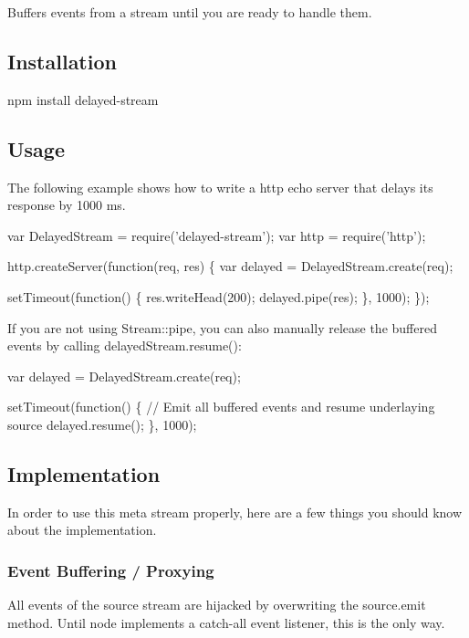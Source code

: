 Buffers events from a stream until you are ready to handle them.

\subsection*{Installation}


\begin{DoxyCode}
npm install delayed-stream
\end{DoxyCode}


\subsection*{Usage}

The following example shows how to write a http echo server that delays its response by 1000 ms.


\begin{DoxyCode}
var DelayedStream = require('delayed-stream');
var http = require('http');

http.createServer(function(req, res) \{
  var delayed = DelayedStream.create(req);

  setTimeout(function() \{
    res.writeHead(200);
    delayed.pipe(res);
  \}, 1000);
\});
\end{DoxyCode}


If you are not using {\ttfamily Stream\+::pipe}, you can also manually release the buffered events by calling {\ttfamily delayed\+Stream.\+resume()}\+:


\begin{DoxyCode}
var delayed = DelayedStream.create(req);

setTimeout(function() \{
  // Emit all buffered events and resume underlaying source
  delayed.resume();
\}, 1000);
\end{DoxyCode}


\subsection*{Implementation}

In order to use this meta stream properly, here are a few things you should know about the implementation.

\subsubsection*{Event Buffering / Proxying}

All events of the {\ttfamily source} stream are hijacked by overwriting the {\ttfamily source.\+emit} method. Until node implements a catch-\/all event listener, this is the only way.

